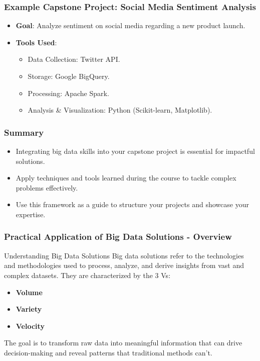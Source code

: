 \documentclass[aspectratio=169]{beamer}
\begin{document}
\begin{frame}[fragile]
    \frametitle{Example Capstone Project: Social Media Sentiment Analysis}
    \begin{itemize}
        \item \textbf{Goal}: Analyze sentiment on social media regarding a new product launch.
        \item \textbf{Tools Used}:
            \begin{itemize}
                \item Data Collection: Twitter API.
                \item Storage: Google BigQuery.
                \item Processing: Apache Spark.
                \item Analysis \& Visualization: Python (Scikit-learn, Matplotlib).
            \end{itemize}
    \end{itemize}
\end{frame}

\begin{frame}[fragile]
    \frametitle{Summary}
    \begin{itemize}
        \item Integrating big data skills into your capstone project is essential for impactful solutions.
        \item Apply techniques and tools learned during the course to tackle complex problems effectively.
        \item Use this framework as a guide to structure your projects and showcase your expertise.
    \end{itemize}
\end{frame}

\begin{frame}[fragile]
    \frametitle{Practical Application of Big Data Solutions - Overview}
    \begin{block}{Understanding Big Data Solutions}
        Big data solutions refer to the technologies and methodologies used to process, analyze, and derive insights from vast and complex datasets. 
        They are characterized by the 3 Vs: 
        \begin{itemize}
            \item \textbf{Volume}
            \item \textbf{Variety}
            \item \textbf{Velocity}
        \end{itemize}
        The goal is to transform raw data into meaningful information that can drive decision-making and reveal patterns that traditional methods can't.
    \end{block}
\end{frame}
\end{document}
